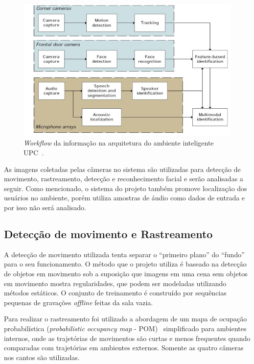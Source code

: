 \begin{figure}[hbt]
		\begin{center}
			\includegraphics[scale=0.5]{figuras/3.TrabalhosCorrelatos/workflow.png}
		\end{center}
		\caption{\textit{Workflow} da informação na arquitetura do ambiente inteligente UPC~\cite{salah}.}
		\label{workflow}
	\end{figure}

As imagens coletadas pelas câmeras no sistema são utilizadas para detecção de movimento, rastreamento, detecção e reconhecimento facial e serão analisadas a seguir. Como mencionado, o sistema do projeto também promove localização dos usuários no ambiente, porém utiliza amostras de áudio como dados de entrada e por isso não será analisado.

\subsection{Detecção de movimento e Rastreamento}

A detecção de movimento utilizada tenta separar o ``primeiro plano'' do ``fundo'' para o seu funcionamento. O método que o projeto utiliza é baseado na detecção de objetos em movimento sob a suposição que imagens em uma cena sem objetos em movimento mostra regularidades, que podem ser modeladas utilizando métodos estáticos. O conjunto de treinamento é construído por sequências pequenas de gravações \textit{offline} feitas da sala vazia.

Para realizar o rastreamento foi utilizado a abordagem de um mapa de ocupação probabilística (\textit{probabilistic occupancy map} - POM)~\cite{pom} simplificado para ambientes internos, onde as trajetórias de movimentos são curtas e menos frequentes quando comparadas com trajetórias em ambientes externos. Somente as quatro câmeras nos cantos são utilizadas.

